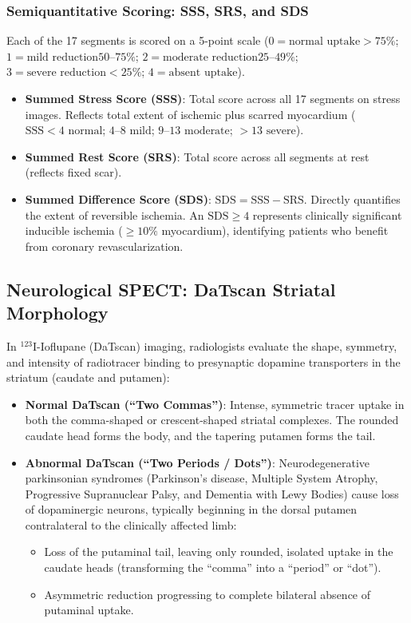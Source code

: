\documentclass[11pt,a4paper]{article}
\begin{document}
\subsubsection{Semiquantitative Scoring: SSS, SRS, and SDS}
Each of the 17 segments is scored on a 5-point scale ($0 = \text{normal uptake} >75\%$; $1 = \text{mild reduction} 50\text{--}75\%$; $2 = \text{moderate reduction} 25\text{--}49\%$; $3 = \text{severe reduction} <25\%$; $4 = \text{absent uptake}$).
\begin{itemize}
    \item \textbf{Summed Stress Score (SSS)}: Total score across all 17 segments on stress images. Reflects total extent of ischemic plus scarred myocardium ($\text{SSS} < 4\text{ normal}$; $4\text{--}8\text{ mild}$; $9\text{--}13\text{ moderate}$; $>13\text{ severe}$).
    \item \textbf{Summed Rest Score (SRS)}: Total score across all segments at rest (reflects fixed scar).
    \item \textbf{Summed Difference Score (SDS)}: $\text{SDS} = \text{SSS} - \text{SRS}$. Directly quantifies the extent of reversible ischemia. An $\text{SDS} \ge 4$ represents clinically significant inducible ischemia ($\ge 10\%$ myocardium), identifying patients who benefit from coronary revascularization.
\end{itemize}

\subsection{Neurological SPECT: DaTscan Striatal Morphology}
In $^{123}\text{I}$-Ioflupane (DaTscan) imaging, radiologists evaluate the shape, symmetry, and intensity of radiotracer binding to presynaptic dopamine transporters in the striatum (caudate and putamen):
\begin{itemize}[leftmargin=*]
    \item \textbf{Normal DaTscan (``Two Commas'')}: Intense, symmetric tracer uptake in both the comma-shaped or crescent-shaped striatal complexes. The rounded caudate head forms the body, and the tapering putamen forms the tail.
    \item \textbf{Abnormal DaTscan (``Two Periods / Dots'')}: Neurodegenerative parkinsonian syndromes (Parkinson's disease, Multiple System Atrophy, Progressive Supranuclear Palsy, and Dementia with Lewy Bodies) cause loss of dopaminergic neurons, typically beginning in the dorsal putamen contralateral to the clinically affected limb:
    \begin{itemize}
        \item Loss of the putaminal tail, leaving only rounded, isolated uptake in the caudate heads (transforming the ``comma'' into a ``period'' or ``dot'').
        \item Asymmetric reduction progressing to complete bilateral absence of putaminal uptake.
    \end{itemize}
\end{itemize}
\end{document}
